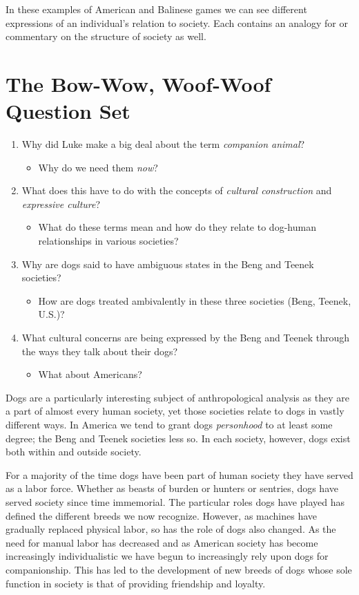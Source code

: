 \documentclass[12pt]{article}
\begin{document}
In these examples of American and Balinese games we can see different
expressions of an individual's relation to society. Each contains an analogy for
or commentary on the structure of society as well.

\section{The Bow-Wow, Woof-Woof Question Set}
\label{sec:org1c4d264}
\begin{enumerate}
\item Why did Luke make a big deal about the term \emph{companion animal}?
\begin{itemize}
\item Why do we need them \emph{now}?
\end{itemize}
\item What does this have to do with the concepts of \emph{cultural construction} and
\emph{expressive culture}?
\begin{itemize}
\item What do these terms mean and how do they relate to dog-human relationships
in various societies?
\end{itemize}
\item Why are dogs said to have ambiguous states in the Beng and Teenek societies?
\begin{itemize}
\item How are dogs treated ambivalently in these three societies (Beng, Teenek,
U.S.)?
\end{itemize}
\item What cultural concerns are being expressed by the Beng and Teenek through the ways they talk about their dogs?
\begin{itemize}
\item What about Americans?
\end{itemize}
\end{enumerate}


Dogs are a particularly interesting subject of anthropological analysis as they
are a part of almost every human society, yet those societies relate to dogs in
vastly different ways. In America we tend to grant dogs \emph{personhood} to at least
some degree; the Beng and Teenek societies less so. In each society, however,
dogs exist both within and outside society.

For a majority of the time dogs have been part of human society they have served
as a labor force. Whether as beasts of burden or hunters or sentries, dogs have
served society since time immemorial. The particular roles dogs have played has
defined the different breeds we now recognize. However, as machines have
gradually replaced physical labor, so has the role of dogs also changed. As the
need for manual labor has decreased and as American society has become
increasingly individualistic we have begun to increasingly rely upon dogs for
companionship. This has led to the development of new breeds of dogs whose sole
function in society is that of providing friendship and loyalty.
\end{document}
